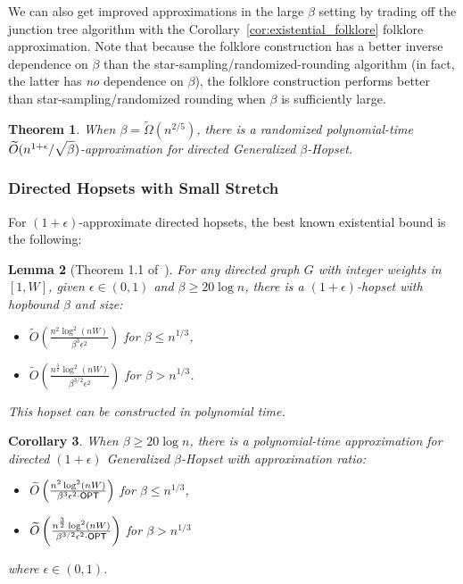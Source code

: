 \documentclass{article}
\newtheorem{theorem}{Theorem}[section]
\newtheorem{corollary}[theorem]{Corollary}
\newtheorem{lemma}[theorem]{Lemma}
\theoremstyle{definition}
\theoremstyle{remark}
\def\be    {\beta}
\def\opt {{\sf OPT}}
\def\hopset {{\sc Generalized $\beta$-Hopset}}
\begin{document}
We can also get improved approximations in the large $\beta$ setting by trading off the junction tree algorithm with the Corollary~\ref{cor:existential_folklore} folklore approximation. Note that because the folklore construction has a better inverse dependence on $\beta$ than the star-sampling/randomized-rounding algorithm (in fact, the latter has \textit{no} dependence on $\be$), the folklore construction performs better than star-sampling/randomized rounding when $\be$ is sufficiently large.

\begin{theorem} \label{thm:big_be_dir_gen}
    When $\be = \widetilde{\Omega}(n^{2/5})$, there is a randomized polynomial-time $\widetilde{O}( n^{1+\epsilon} / \sqrt{\vphantom{\be^k} \be})$-approximation for directed {\hopset}.
\end{theorem}

\subsubsection{Directed Hopsets with Small Stretch}

For $(1+\epsilon)$-approximate directed hopsets, the best known existential bound is the following:

\begin{lemma}[Theorem 1.1 of~\cite{BW23}]
    For any directed graph $G$ with integer weights in $[1,W]$, given $\epsilon \in (0,1)$ and $\beta \geq  20\log n$, there is a $(1+\epsilon)$-hopset with hopbound $\beta$ and size:
    \begin{itemize}
        \item $\widetilde{O}\left(\frac{n^2\log^2(nW)}{\beta^3 \epsilon^2  }\right)$ for $\beta \leq n^{1/3}$,
        \item $\widetilde{O}\left(\frac{n^{\frac{3}{2}} \log^2(nW)}{\beta^{3/2} \epsilon^2}\right)$ for $\beta >n^{1/3}$.
    \end{itemize} 
    This hopset can be constructed in polynomial time.
\end{lemma}
\begin{corollary} \label{cor:existential_W}
    When $\beta \geq 20\log n$, there is a polynomial-time approximation for directed $(1+\epsilon)$ {\hopset} with approximation ratio:
        \begin{itemize}
        \item $\widetilde{O}\left(\frac{n^2\log^2(nW)}{\beta^3 \epsilon^2 \cdot \opt  }\right)$ for $\beta \leq n^{1/3}$,
        \item $\widetilde{O}\left(\frac{n^{\frac{3}{2}} \log^2(nW)}{\beta^{3/2} \epsilon^2 \cdot \opt}\right)$ for $\beta >n^{1/3}$
    \end{itemize}
    where $\epsilon \in (0,1)$.
\end{corollary}
\end{document}
